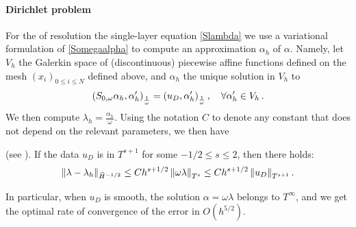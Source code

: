 \documentclass[a4paper]{subfiles}
\begin{document}
\paragraph{Dirichlet problem} For the of resolution the single-layer equation \eqref{Slambda} we use a variational formulation of \eqref{Somegaalpha} 
to compute an approximation $\alpha_h$ of $\alpha$. Namely, let $V_h$ the Galerkin space of (discontinuous) piecewise affine functions 
defined on the mesh $(x_i)_{0\leq i \leq N}$ defined above, and $\alpha_h$ the unique solution in $V_h$ to
\[ \left( S_{0,\omega} \alpha_h,\alpha_h'\right)_\frac{1}{\omega} = \left( u_D,\alpha_h'\right)_\frac{1}{\omega}, \quad \forall \alpha_h' \in V_h\,.\]
We then compute $\lambda_h = \frac{\alpha_h}{\omega}$. Using the notation $C$ to denote any constant that does not depend on the relevant parameters, we then have
\begin{theorem}(see \cite{averseng}).
	If the data $u_D$ is in $T^{s+1}$ for some $-1/2 \leq s \leq 2$, then there holds:
	\[ \left\|\lambda - \lambda_h\right\|_{\tilde{H}^{-1/2}} \leq C h^{s+1/2} \left\|\omega \lambda\right\|_{T^{s}}\leq C h^{s+1/2} \left\|u_D\right\|_{T^{s+1}}.\]
	\label{theOrdreCVDirichlet}
\end{theorem}
In particular, when $u_D$ is smooth, the solution $\alpha = \omega \lambda$ belongs to $T^{\infty}$, and we get the optimal rate of convergence of the error in  
$O(h^{5/2})$.
\end{document}
